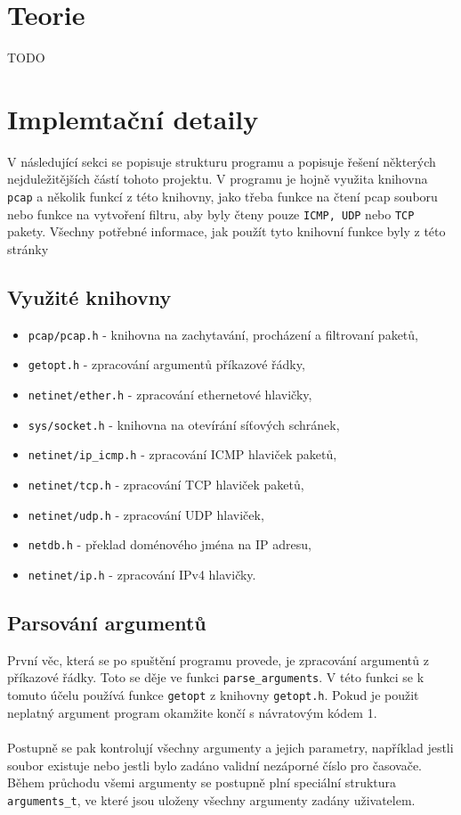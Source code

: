 \documentclass[12pt]{article}
\begin{document}
\section{Teorie}
TODO
\pagebreak
\section{Implemtační detaily}
V následující sekci se popisuje strukturu programu a popisuje řešení některých nejduležitějších částí tohoto projektu.
V programu je hojně využita knihovna \texttt{pcap} a několik funkcí z této knihovny, jako třeba funkce na čtení pcap souboru nebo funkce
na vytvoření filtru, aby byly čteny pouze \texttt{ICMP, UDP} nebo \texttt{TCP} pakety. Všechny potřebné informace, jak použít tyto knihovní funkce byly z této stránky  

\subsection*{Využité knihovny}
\begin{itemize}
	\item \texttt{pcap/pcap.h} - knihovna na zachytavání, procházení a filtrovaní paketů, 
	\item \texttt{getopt.h} - zpracování argumentů příkazové řádky,
	\item \texttt{netinet/ether.h} - zpracování ethernetové hlavičky, 
	\item \texttt{sys/socket.h} - knihovna na otevírání síťových schránek,
	\item \texttt{netinet/ip\_icmp.h} - zpracování ICMP hlaviček paketů,
	\item \texttt{netinet/tcp.h} - zpracování TCP hlaviček paketů,
	\item \texttt{netinet/udp.h} - zpracování UDP hlaviček,
	\item \texttt{netdb.h} - překlad doménového jména na IP adresu,
	\item \texttt{netinet/ip.h} - zpracování IPv4 hlavičky.
\end{itemize}
\subsection{Parsování argumentů}
První věc, která se po spuštění programu provede, je zpracování argumentů z příkazové řádky. Toto se děje ve funkci \texttt{parse\_arguments}. V této funkci se k tomuto účelu používá funkce 
\texttt{getopt} z knihovny \texttt{getopt.h}. Pokud je použit neplatný argument program okamžite končí s návratovým kódem 1. 
\\\\
Postupně se pak kontrolují všechny argumenty a jejich parametry, například jestli soubor existuje nebo jestli bylo zadáno validní nezáporné číslo pro časovače.
Během průchodu všemi argumenty se postupně plní speciální struktura \texttt{arguments\_t}, ve které jsou uloženy všechny argumenty zadány uživatelem.
\end{document}
